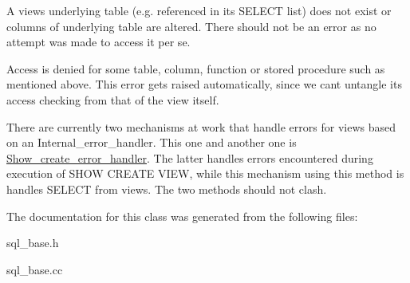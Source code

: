 \begin{DoxyItemize}
\item A view\textquotesingle{}s underlying table (e.\+g. referenced in its S\+E\+L\+E\+CT list) does not exist or columns of underlying table are altered. There should not be an error as no attempt was made to access it per se.
\item Access is denied for some table, column, function or stored procedure such as mentioned above. This error gets raised automatically, since we can\textquotesingle{}t untangle its access checking from that of the view itself.

There are currently two mechanisms at work that handle errors for views based on an Internal\+\_\+error\+\_\+handler. This one and another one is \mbox{\hyperlink{classShow__create__error__handler}{Show\+\_\+create\+\_\+error\+\_\+handler}}. The latter handles errors encountered during execution of S\+H\+OW C\+R\+E\+A\+TE V\+I\+EW, while this mechanism using this method is handles S\+E\+L\+E\+CT from views. The two methods should not clash. 
\end{DoxyItemize}

The documentation for this class was generated from the following files\+:\begin{DoxyCompactItemize}
\item 
sql\+\_\+base.\+h\item 
sql\+\_\+base.\+cc\end{DoxyCompactItemize}

